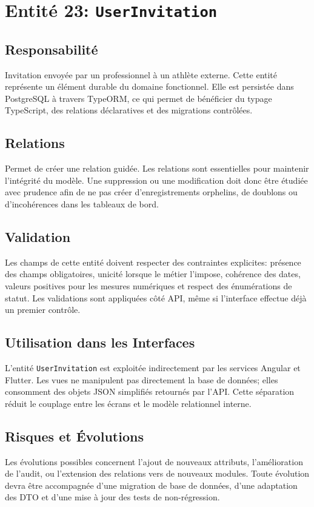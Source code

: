 \section{Entité 23: \texttt{UserInvitation}}
\subsection{Responsabilité}
Invitation envoyée par un professionnel à un athlète externe. Cette entité représente un élément durable du domaine fonctionnel. Elle est persistée dans PostgreSQL à travers TypeORM, ce qui permet de bénéficier du typage TypeScript, des relations déclaratives et des migrations contrôlées.

\subsection{Relations}
Permet de créer une relation guidée. Les relations sont essentielles pour maintenir l'intégrité du modèle. Une suppression ou une modification doit donc être étudiée avec prudence afin de ne pas créer d'enregistrements orphelins, de doublons ou d'incohérences dans les tableaux de bord.

\subsection{Validation}
Les champs de cette entité doivent respecter des contraintes explicites: présence des champs obligatoires, unicité lorsque le métier l'impose, cohérence des dates, valeurs positives pour les mesures numériques et respect des énumérations de statut. Les validations sont appliquées côté API, même si l'interface effectue déjà un premier contrôle.

\subsection{Utilisation dans les Interfaces}
L'entité \texttt{UserInvitation} est exploitée indirectement par les services Angular et Flutter. Les vues ne manipulent pas directement la base de données; elles consomment des objets JSON simplifiés retournés par l'API. Cette séparation réduit le couplage entre les écrans et le modèle relationnel interne.

\subsection{Risques et Évolutions}
Les évolutions possibles concernent l'ajout de nouveaux attributs, l'amélioration de l'audit, ou l'extension des relations vers de nouveaux modules. Toute évolution devra être accompagnée d'une migration de base de données, d'une adaptation des DTO et d'une mise à jour des tests de non-régression.



